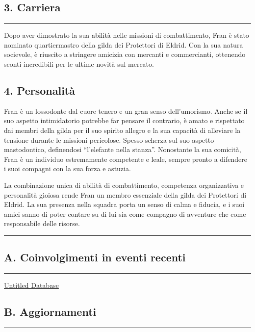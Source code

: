 \subsection{3. Carriera}\label{carriera}

\begin{center}\rule{0.5\linewidth}{0.5pt}\end{center}

Dopo aver dimostrato la sua abilità nelle missioni di combattimento,
Fran è stato nominato quartiermastro della gilda dei Protettori di
Eldrid. Con la sua natura socievole, è riuscito a stringere amicizia con
mercanti e commercianti, ottenendo sconti incredibili per le ultime
novità sul mercato.

\subsection{4. Personalità}\label{personalituxe0}

Fran è un lossodonte dal cuore tenero e un gran senso dell'umorismo.
Anche se il suo aspetto intimidatorio potrebbe far pensare il contrario,
è amato e rispettato dai membri della gilda per il suo spirito allegro e
la sua capacità di alleviare la tensione durante le missioni pericolose.
Spesso scherza sul suo aspetto mastodontico, definendosi ``l'elefante
nella stanza''. Nonostante la sua comicità, Fran è un individuo
estremamente competente e leale, sempre pronto a difendere i suoi
compagni con la sua forza e astuzia.

La combinazione unica di abilità di combattimento, competenza
organizzativa e personalità gioiosa rende Fran un membro essenziale
della gilda dei Protettori di Eldrid. La sua presenza nella squadra
porta un senso di calma e fiducia, e i suoi amici sanno di poter contare
su di lui sia come compagno di avventure che come responsabile delle
risorse.

\begin{center}\rule{0.5\linewidth}{0.5pt}\end{center}

\subsection{A. Coinvolgimenti in eventi
recenti}\label{a.-coinvolgimenti-in-eventi-recenti}

\begin{center}\rule{0.5\linewidth}{0.5pt}\end{center}

\href{Untitled\%20Database\%20c977bec678f84b799a4925770fa66698.csv}{Untitled
Database}

\subsection{B. Aggiornamenti}\label{b.-aggiornamenti}

\begin{center}\rule{0.5\linewidth}{0.5pt}\end{center}

\href{Untitled\%208bd95847a17f4fb69a1aba05ab5418f7.csv}{}
